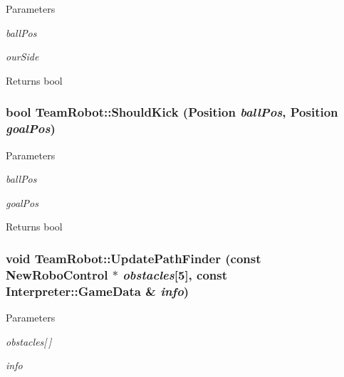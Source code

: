 \begin{DoxyParams}{Parameters}
\item[{\em ballPos}]\item[{\em ourSide}]\end{DoxyParams}
\begin{DoxyReturn}{Returns}
bool 
\end{DoxyReturn}
\hypertarget{classTeamRobot_ac979572f4899940e88f067102ac1ae46}{
\subsubsection[{ShouldKick}]{\setlength{\rightskip}{0pt plus 5cm}bool TeamRobot::ShouldKick (Position {\em ballPos}, \/  Position {\em goalPos})}}
\label{classTeamRobot_ac979572f4899940e88f067102ac1ae46}

\begin{DoxyParams}{Parameters}
\item[{\em ballPos}]\item[{\em goalPos}]\end{DoxyParams}
\begin{DoxyReturn}{Returns}
bool 
\end{DoxyReturn}
\hypertarget{classTeamRobot_a1216ffb71821002b6e6845390c990d5f}{
\subsubsection[{UpdatePathFinder}]{\setlength{\rightskip}{0pt plus 5cm}void TeamRobot::UpdatePathFinder (const {\bf NewRoboControl} $\ast$ {\em obstacles}\mbox{[}5\mbox{]}, \/  const {\bf Interpreter::GameData} \& {\em info})}}
\label{classTeamRobot_a1216ffb71821002b6e6845390c990d5f}

\begin{DoxyParams}{Parameters}
\item[{\em obstacles\mbox{[}$\,$\mbox{]}}]\item[{\em info}]\end{DoxyParams}


